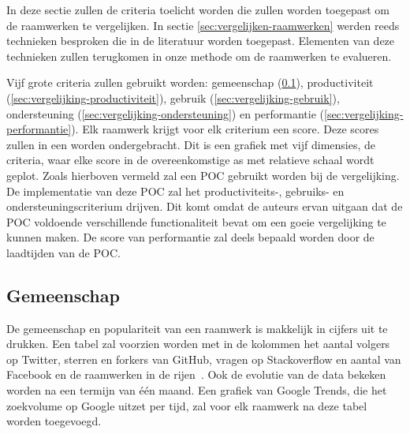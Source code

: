 In deze sectie zullen de criteria toelicht worden die zullen worden toegepast om de raamwerken te vergelijken.
In sectie \ref{sec:vergelijken-raamwerken} werden reeds technieken besproken die in de literatuur worden toegepast.
Elementen van deze technieken zullen terugkomen in onze methode om de raamwerken te evalueren.

Vijf grote criteria zullen gebruikt worden:  gemeenschap (\ref{sec:vergelijking-gemeenschap}), productiviteit (\ref{sec:vergelijking-productiviteit}), gebruik (\ref{sec:vergelijking-gebruik}), ondersteuning (\ref{sec:vergelijking-ondersteuning}) en performantie (\ref{sec:vergelijking-performantie}). 
Elk raamwerk krijgt voor elk criterium een score. 
Deze scores zullen in een  worden ondergebracht.  
Dit is een grafiek met vijf dimensies,  de criteria,     waar elke score in de overeenkomstige as met relatieve schaal wordt geplot.
Zoals hierboven vermeld zal een POC gebruikt worden bij de vergelijking.
De implementatie van deze POC zal het productiviteits-, gebruiks- en ondersteuningscriterium drijven.  
Dit komt omdat de auteurs ervan uitgaan dat de POC voldoende verschillende functionaliteit bevat om een goeie vergelijking te kunnen maken.
De score van performantie zal deels bepaald worden door de laadtijden van de POC.


\subsection{Gemeenschap}
\label{sec:vergelijking-gemeenschap}
De gemeenschap en populariteit van een raamwerk is makkelijk in cijfers uit te drukken. 
Een tabel zal voorzien worden met in de kolommen het aantal volgers op Twitter, sterren en forkers van GitHub,  vragen op Stackoverflow en aantal  van Facebook en de raamwerken in de rijen~\cite{Sarrafi2012a,Ayuso2012}. 
Ook de evolutie van de data bekeken worden na een termijn van één maand.
Een grafiek van Google Trends, die het zoekvolume op Google uitzet per tijd, zal voor elk raamwerk na deze tabel worden toegevoegd.


